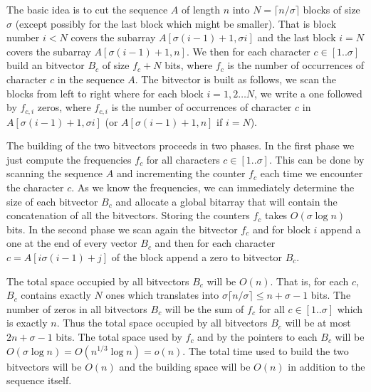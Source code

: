 \documentclass[a4paper]{article}
\begin{document}
The basic idea is to cut the sequence $A$ of length $n$ into $N=\lceil n/\sigma\rceil$ blocks of size $\sigma$ (except possibly for the last block which might be smaller). That is block number $i<N$ covers the subarray $A[\sigma(i-1)+1,\sigma i]$ and the last block $i=N$ covers the subarray $A[\sigma(i-1)+1,n]$. 
We then for each character $c\in[1..\sigma]$ build an bitvector $B_c$ of size $f_c+N$ bits, where $f_c$ is the number of occurrences of character $c$ in the sequence $A$. The bitvector is built as follows, we scan the blocks from left to right where for each block $i=1,2\ldots N$, we write a one followed by $f_{c,i}$ zeros, where $f_{c,i}$ is the number of occurrences of character $c$ in $A[\sigma(i-1)+1,\sigma i]$ (or $A[\sigma(i-1)+1,n]$ if $i=N$). 

The building of the two bitvectors proceeds in two phases. In the first phase we just compute the frequencies $f_c$ for all characters $c\in[1..\sigma]$. This can be done by scanning the sequence $A$ and incrementing the counter $f_c$ each time we encounter the character $c$. As we know the frequencies, we can immediately determine the size of each bitvector $B_c$ and allocate a global bitarray that will contain the concatenation of all the bitvectors. Storing the counters $f_c$ takes $O(\sigma\log n)$ bits. 
In the second phase we scan again the bitvector $f_c$ and for block $i$ append a one at the end of every vector $B_c$ and then for each character $c=A[i\sigma(i-1)+j]$ of the block append a zero to bitvector $B_c$. 


The total space occupied by all bitvectors $B_c$ will be $O(n)$. That is, for each $c$, $B_c$ contains exactly $N$ ones 
which translates into $\sigma\lceil n/\sigma\rceil\leq n+\sigma-1$ bits. The number of zeros in all bitvectors $B_c$ will be the sum of $f_c$ for all $c\in[1..\sigma]$ which is exactly $n$. 
Thus the total space occupied by all bitvectors $B_c$ will be at most $2n+\sigma-1$ bits. 
The total space used by $f_c$ and by the pointers to each $B_c$ will be $O(\sigma\log n)=O( n^{1/3}\log n)=o(n)$. 
The total time used to build the two bitvectors will be $O(n)$ and the building space will be $O(n)$  in addition to the sequence itself. 
\end{document}
